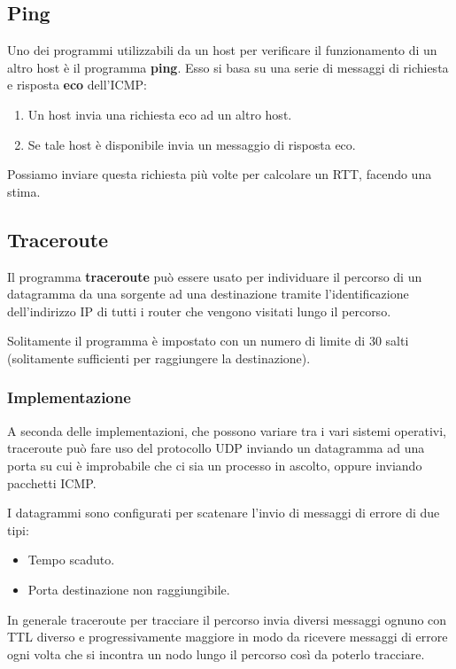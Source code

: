 \subsection{Ping}
Uno dei programmi utilizzabili da un host per verificare il 
funzionamento di un altro host è il programma \textbf{ping}. Esso si
basa su una serie di messaggi di richiesta e risposta \textbf{eco}
dell'ICMP:
\begin{enumerate}
	\item Un host invia una richiesta eco ad un altro host.
	\item Se tale host è disponibile invia un messaggio di risposta
		eco.
\end{enumerate}
Possiamo inviare questa richiesta più volte per calcolare un RTT,
facendo una stima.

\subsection{Traceroute}
Il programma \textbf{traceroute} può essere usato per individuare
il percorso di un datagramma da una sorgente ad una destinazione
tramite l'identificazione dell'indirizzo IP di tutti i router che
vengono visitati lungo il percorso.

Solitamente il programma è impostato con un numero di limite di 30
salti (solitamente sufficienti per raggiungere la destinazione).

\subsubsection{Implementazione}
A seconda delle implementazioni, che possono variare tra i vari sistemi
operativi, traceroute può fare uso del protocollo UDP inviando un 
datagramma ad una porta su cui è improbabile che ci sia un processo in 
ascolto, oppure inviando pacchetti ICMP.

I datagrammi sono configurati per scatenare l'invio di messaggi di 
errore di due tipi:
\begin{itemize}
	\item Tempo scaduto.
	\item Porta destinazione non raggiungibile.
\end{itemize}
In generale traceroute per tracciare il percorso invia diversi messaggi
ognuno con TTL diverso e progressivamente maggiore in modo da ricevere
messaggi di errore ogni volta che si incontra un nodo lungo il percorso
così da poterlo tracciare.
